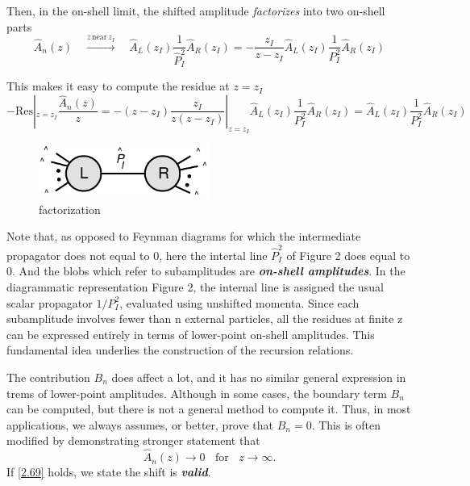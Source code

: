 \documentclass[12pt]{article}
\numberwithin{equation}{section}
\newcommand{\tif}[1]{\textit{\textbf{#1}}}
\begin{document}
Then, in the on-shell limit, the shifted amplitude \textit{factorizes} into two on-shell parts
\begin{equation}
     \hat{A}_n(z)\quad \xrightarrow{z\,\text{near}\,z_I} \quad \hat{A}_L(z_I)\frac{1}{\hat{P}_I^2}\hat{A}_R(z_I)= - \frac{z_I}{z-z_I}\hat{A}_L(z_I)\frac{1}{P_I^2}\hat{A}_R(z_I)
\end{equation}

This makes it easy to compute the residue at $z=z_I$
\begin{equation}
    -\mathrm{Res}|_{z=z_I}\frac{\hat{A}_n(z)}{z}=-(z-z_I)\frac{z_I}{z(z-z_I)}|_{z=z_I}\hat{A}_L(z_I)\frac{1}{P_I^2}\hat{A}_R(z_I)=\hat{A}_L(z_I)\frac{1}{P_I^2}\hat{A}_R(z_I)
\end{equation}

\begin{figure}[H]
    \centering
    \includegraphics[width=0.5\textwidth]{recrel1.pdf} %
    \caption{factorization}
\end{figure}

Note that, as opposed to Feynman diagrams for which the intermediate propagator does not equal to 0, here the intertal line $\hat{P}_I^2$ of Figure 2 does equal to 0.
And the blobs which refer to subamplitudes are \tif{on-shell amplitudes}. In the diagrammatic representation Figure 2, the internal line is assigned the usual scalar propagator 
$1/P_I^2$, evaluated using unshifted momenta. Since each subamplitude involves fewer than 
n external particles, all the residues at finite z can be expressed entirely in terms of lower-point on-shell amplitudes. 
This fundamental idea underlies the construction of the recursion relations.

The contribution $B_n$ does affect a lot, and it has no similar general expression in trems of lower-point amplitudes. Although in some cases, the boundary term
$B_n$ can be computed, but there is not a general method to compute it. Thus, in most applications, we always assumes, or better, prove that $B_n=0$. This is often modified
by demonstrating stronger statement that 
\begin{equation}
    \hat{A}_n(z) \to 0 ~~~~ \text{for} ~~~~ z \to \infty. 
    \label{2.69}
\end{equation}
If \eqref{2.69} holds, we state the shift is \tif{valid}.
\end{document}
